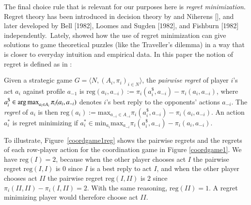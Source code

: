 \documentclass[fleqn,reqno,11pt]{article}
\begin{document}
The final choice rule that is relevant for our purposes here is \emph{regret
  minimization}. Regret theory has been introduced in decision theory by
\citet{Savage1951:The-theory-of-s} and Niherens [], and later developed by Bell [1982], Loomes
and Sugden [1982], and Fishburn [1982] independently.\ Lately,
\citet{HalpernPass2012:Iterated-Regret} showed how the use of regret minimization can give
solutions to game theoretical puzzles (like the Traveller's dilemma) in a way that is closer to
everyday intuition and empirical data. In this paper the notion of regret is defined as in
\citet{HalpernPass2012:Iterated-Regret}:

\begin{definition} \label{defn:regret} Given a strategic game
  $ G=\langle N, (A_i , \pi_i)_{i \in N} \rangle $, the \emph{pairwise regret} of player $i$'s
  act $a_i$ against profile $a_{-1}$ is
  $\text{reg}(a_i,a_{-i}):= \pi_i(a_i^\$,a_{-i})-\pi_i(a_i,a_{-i}) $, where
  $a_i^\$ \in \operatorname*{arg\,max}_{a_i \in A_i} \pi_i(a_i, a_{-i})$ denotes $i$'s best reply to the
  opponents' actions $a_{-i}$. The \emph{regret} of $a_i$ is then
  $\text{reg}(a_i):= \text{max}_{a_{-i}\in A_{-i}} \pi_i(a_i^\$,a_{-i})-\pi_i(a_i,a_{-i}) $. An
  action $a^{*}_i $ is regret minimizing if
  $a^{*}_i \in \text{min}_{a_i} \text{max}_{a_{-i}} \pi_i(a_i^\$,a_{-i})-\pi_i(a_i,a_{-i}) $.
\end{definition}


To illustrate, Figure~\ref{coordgame1reg} shows the pairwise regrets and the regrets of each
row-player action for the coordination game in Figure \ref{coordgame1}. We have
$\text{reg}(I)=2$, because when the other player chooses act $I$ the pairwise regret
$\text{reg}(I,I)$ is $0$ since $I$ is a best reply to act $I$, and when the other player
chooses act $II$ the pairwise regret $\text{reg}(I, II)$ is $2$ since
$\pi_i(II,II)-\pi_i(I,II)=2$. With the same reasoning, $\text{reg}(II)=1$. A regret minimizing
player would therefore choose act $II$.
\end{document}
